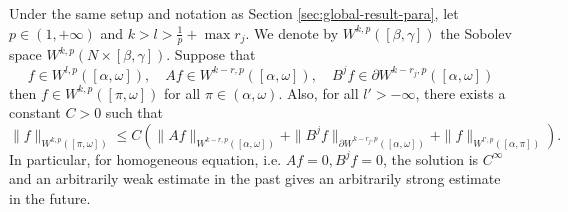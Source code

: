 \begin{theorem}
\label{thm:reg-parabolic}
Under the same setup and notation as Section \ref{sec:global-result-para}, let \(p\in
(1,+\infty)\) and \(k>l> \frac{1}{p}+\max r_j\). We denote by \(W^{k,p}([\beta,\gamma])\) the Sobolev space \(W^{k,p}(N\times[\beta,\gamma])\). Suppose that
\[
 f\in W^{l,p}([\alpha,\omega]),\quad Af\in W^{k-r,p}( [\alpha,\omega]),\quad
B^j f \in \partial W^{k-r_j,p}( [\alpha,\omega])
\]
then \(f\in W^{k,p}([\pi,\omega])\) for all \(\pi \in (\alpha,\omega)\). Also, for all  \(l' > -\infty\), there exists a constant \(C>0\) such that
\[
 \|f\|_{W^{k,p}([\pi,\omega])} \leq C \left( \|Af\|_{W^{k-r,p}([\alpha,\omega])} + \|B^j
f\|_{\partial W^{k-r_j,p}([\alpha,\omega])} + \| f \|_{W^{l',p}([\alpha,\pi])}  \right).
\]
In particular, for homogeneous equation, i.e. \(Af = 0, B^j f = 0\), the solution is \(C^\infty\) and an arbitrarily weak estimate in the past gives an arbitrarily strong
estimate in the future.
\end{theorem}

